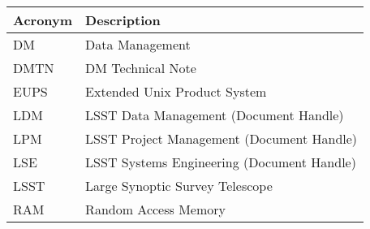\addtocounter{table}{-1}
\begin{longtable}{p{}p{}}\hline
\textbf{Acronym} & \textbf{Description}  \\\hline

DM & Data Management \\\hline
DMTN & DM Technical Note \\\hline
EUPS & Extended Unix Product System \\\hline
LDM & LSST Data Management (Document Handle) \\\hline
LPM & LSST Project Management (Document Handle) \\\hline
LSE & LSST Systems Engineering (Document Handle) \\\hline
LSST & Large Synoptic Survey Telescope \\\hline
RAM & Random Access Memory \\\hline
\end{longtable}
